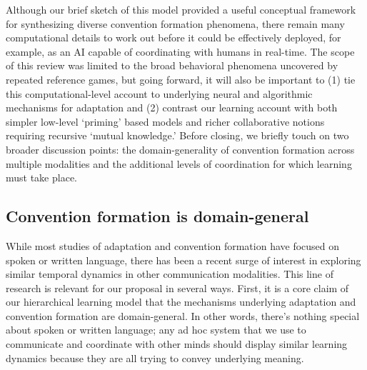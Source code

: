 \documentclass[11pt, floatsintext, jou]{apa6}
\begin{document}
Although our brief sketch of this model provided a useful conceptual framework for synthesizing diverse convention formation phenomena, there remain many computational details to work out before it could be effectively deployed, for example, as an AI capable of coordinating with humans in real-time. 
The scope of this review was limited to the broad behavioral phenomena uncovered by repeated reference games, but going forward, it will also be important to (1) tie this computational-level account to underlying neural and algorithmic mechanisms for adaptation and (2) contrast our learning account with both simpler low-level `priming' based models and richer collaborative notions requiring recursive `mutual knowledge.' Before closing, we briefly touch on two broader discussion points: the domain-generality of convention formation across multiple modalities and the additional levels of coordination for which learning must take place.

\subsection{Convention formation is domain-general}


While most studies of adaptation and convention formation have focused on spoken or written language, there has been a recent surge of interest in exploring similar temporal dynamics in other communication modalities. This line of research is relevant for our proposal in several ways. First, it is a core claim of our hierarchical learning model that the mechanisms underlying adaptation and convention formation are domain-general. In other words, there's nothing special about spoken or written language; any ad hoc system that we use to communicate and coordinate with other minds should display similar learning dynamics because they are all trying to convey underlying meaning. 
\end{document}
